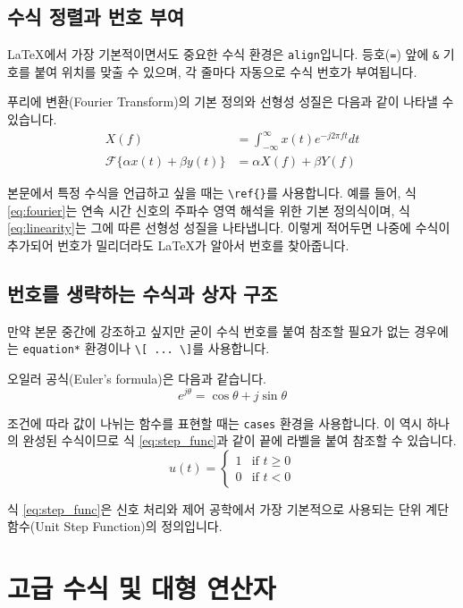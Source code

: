\documentclass[12pt,a4paper,oneside]{memoir}
\begin{document}
\section{수식 정렬과 번호 부여}
LaTeX에서 가장 기본적이면서도 중요한 수식 환경은 \texttt{align}입니다. 등호(\texttt{=}) 앞에 \texttt{\&} 기호를 붙여 위치를 맞출 수 있으며, 각 줄마다 자동으로 수식 번호가 부여됩니다.

푸리에 변환(Fourier Transform)의 기본 정의와 선형성 성질은 다음과 같이 나타낼 수 있습니다.
\begin{align}
    X(f) &= \int_{-\infty}^{\infty} x(t) e^{-j 2\pi f t} dt \label{eq:fourier} \\
    \mathcal{F}\{\alpha x(t) + \beta y(t)\} &= \alpha X(f) + \beta Y(f) \label{eq:linearity}
\end{align}

본문에서 특정 수식을 언급하고 싶을 때는 \texttt{\textbackslash ref\{\}}를 사용합니다. 예를 들어, 식 \ref{eq:fourier}는 연속 시간 신호의 주파수 영역 해석을 위한 기본 정의식이며, 식 \ref{eq:linearity}는 그에 따른 선형성 성질을 나타냅니다. 이렇게 적어두면 나중에 수식이 추가되어 번호가 밀리더라도 LaTeX가 알아서 번호를 찾아줍니다.


\section{번호를 생략하는 수식과 상자 구조}
만약 본문 중간에 강조하고 싶지만 굳이 수식 번호를 붙여 참조할 필요가 없는 경우에는 \texttt{equation*} 환경이나 \texttt{\textbackslash[ ... \textbackslash]}를 사용합니다.

오일러 공식(Euler's formula)은 다음과 같습니다.
\[
    e^{j\theta} = \cos\theta + j\sin\theta
\]

조건에 따라 값이 나뉘는 함수를 표현할 때는 \texttt{cases} 환경을 사용합니다. 이 역시 하나의 완성된 수식이므로 식 \ref{eq:step_func}과 같이 끝에 라벨을 붙여 참조할 수 있습니다.
\begin{equation}
    u(t) = \begin{cases}
        1 & \text{if } t \ge 0 \\
        0 & \text{if } t < 0
    \end{cases} \label{eq:step_func}
\end{equation}

식 \ref{eq:step_func}은 신호 처리와 제어 공학에서 가장 기본적으로 사용되는 단위 계단 함수(Unit Step Function)의 정의입니다.


\chapter{고급 수식 및 대형 연산자}
\end{document}
